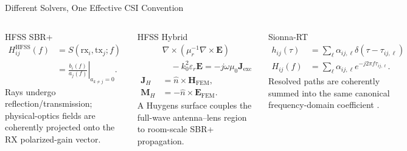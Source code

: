 \begin{frame}[t]{Different Solvers, One Effective CSI Convention}
\scriptsize
\setlength{\abovedisplayskip}{0.25ex}
\setlength{\belowdisplayskip}{0.35ex}
\begin{columns}[T,onlytextwidth]
  \begin{block}{HFSS SBR+}
    {\tiny
    \begin{align*}
      H_{ij}^{\mathrm{HFSS}}(f)
      &=S(\mathrm{rx}_i,\mathrm{tx}_j;f)\\[-2pt]
      &=\left.\frac{b_i(f)}{a_j(f)}\right|_{a_{k\neq j}=0}.
      \tag{2.15}
    \end{align*}}
    Rays undergo reflection/transmission; physical-optics fields are coherently
    projected onto the RX polarized-gain vector.
  \end{block}

  \begin{block}{HFSS Hybrid}
    {\tiny
    \begin{align*}
      &\nabla\!\times\!(\mu_r^{-1}\nabla\!\times\!\mathbf E)\\[-2pt]
      &\quad-k_0^2\varepsilon_r\mathbf E
      =-j\omega\mu_0\mathbf J_{\mathrm{exc}}
      \tag{2.28}\\[-1pt]
      \mathbf J_H&=\hat n\times\mathbf H_{\mathrm{FEM}},\\[-2pt]
      \mathbf M_H&=-\hat n\times\mathbf E_{\mathrm{FEM}}.
      \tag{2.32}
    \end{align*}}
    A Huygens surface couples the full-wave antenna--lens region to room-scale
    SBR+ propagation.
  \end{block}

  \begin{block}{Sionna-RT}
    {\tiny
    \begin{align*}
      h_{ij}(\tau)&=\sum_{\ell}\alpha_{ij,\ell}
      \delta(\tau-\tau_{ij,\ell})
      \tag{2.18}\\
      H_{ij}(f)&=\sum_{\ell}\alpha_{ij,\ell}
      e^{-j2\pi f\tau_{ij,\ell}}.
      \tag{2.19}
    \end{align*}}
    Resolved paths are coherently summed into the same canonical frequency-domain
    coefficient \cite{NVIDIACorporation2026,Tse2005}.
  \end{block}
\end{columns}


\end{frame}

